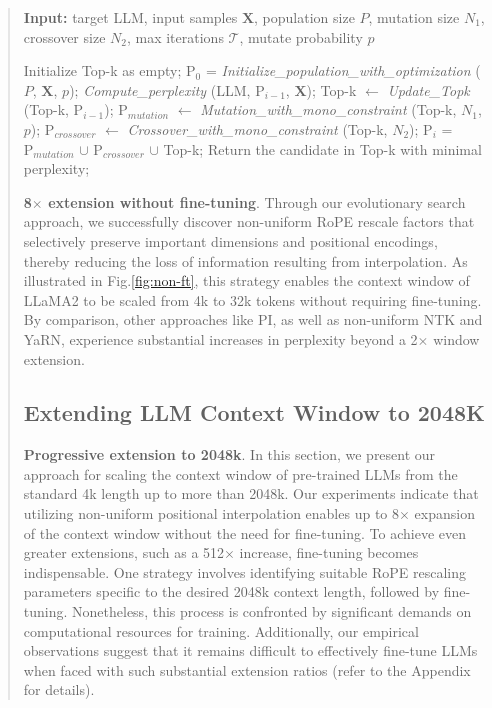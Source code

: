 \begin{abstract}
\begin{algorithm}[t]
	\small
	\caption{The search algorithm}
	\textbf{Input:} target LLM, input samples $\mathbf{X}$,   population size $P$, mutation size $N_1$, crossover size $N_2$, max iterations $\mathcal{T}$, mutate probability $p$\\

	\begin{algorithmic}[1]
		\label{alg:search}
		\STATE Initialize Top-k as empty;	
		\STATE $\text{P}_0$ = \textit{Initialize\_population\_with\_optimization} ($P$, $\mathbf{X}$, $p$); 
		\STATE \textit{Compute\_perplexity} (LLM, $\text{P}_{i-1}$, $\mathbf{X}$);
		\STATE  Top-k $\leftarrow$ \textit{Update\_Topk} (Top-k, $\text{P}_{i-1}$);
		\STATE $\text{P}_{mutation}$ $\leftarrow$ \textit{Mutation\_with\_mono\_constraint} (Top-k, $N_1$, $p$); 
		\STATE $\text{P}_{crossover}$ $\leftarrow$ \textit{Crossover\_with\_mono\_constraint} (Top-k, $N_2$);
		\STATE $\text{P}_i$ = $\text{P}_{mutation}$ $\cup$ $\text{P}_{crossover}$ $\cup$ Top-k;
		\ENDFOR
		\STATE Return the candidate in Top-k with minimal perplexity;
	\end{algorithmic}
\end{algorithm}

\textbf{8$\times$ extension without fine-tuning}. Through our evolutionary search approach, we successfully discover non-uniform RoPE rescale factors that selectively preserve important dimensions and positional encodings, thereby reducing the loss of information resulting from interpolation. As illustrated in Fig.\ref{fig:non-ft}, this strategy enables the context window of LLaMA2 to be scaled from 4k to 32k tokens without requiring fine-tuning. By comparison, other approaches like PI, as well as non-uniform NTK and YaRN, experience substantial increases in perplexity beyond a 2$\times$ window extension.

\subsection{Extending LLM Context Window to 2048K}
\label{sec:extendto2048k}

\textbf{Progressive extension to 2048k}. In this section, we present our approach for scaling the context window of pre-trained LLMs from the standard 4k length up to more than 2048k. Our experiments indicate that utilizing non-uniform positional interpolation enables up to 8$\times$ expansion of the context window without the need for fine-tuning. To achieve even greater extensions, such as a 512$\times$ increase, fine-tuning becomes indispensable. One strategy involves identifying suitable RoPE rescaling parameters specific to the desired 2048k context length, followed by fine-tuning. Nonetheless, this process is confronted by significant demands on computational resources for training. Additionally, our empirical observations suggest that it remains difficult to effectively fine-tune LLMs when faced with such substantial extension ratios (refer to the Appendix for details).


\end{abstract}
